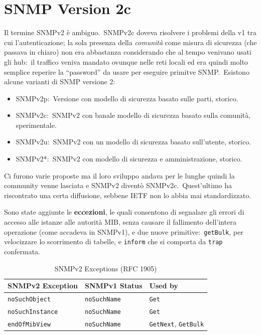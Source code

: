 \section{SNMP Version 2c}

Il termine SNMPv2 è ambiguo.\
SNMPv2c doveva risolvere i problemi della v1 tra cui l'autenticazione; la sola presenza della \textit{comunità} come misura di sicurezza (che passava in chiaro) non era abbastanza considerando che al tempo venivano usati gli hub:\ il traffico veniva mandato ovunque nelle reti locali ed era quindi molto semplice reperire la ``password'' da usare per eseguire primitve SNMP.\
Esistono alcune varianti di SNMP versione 2:
\begin{itemize}
    \item SNMPv2p:\ Versione con modello di sicurezza basato sulle parti, storico.
    \item SNMPv2c:\ SNMPv2 con banale modello di sicurezza basato sulla comunità, sperimentale.
    \item SNMPv2u:\ SNMPv2 con un modello di sicurezza basato sull'utente, storico.
    \item SNMPv2*:\ SNMPv2 con modello di sicurezza e amministrazione, storico.
\end{itemize}
Ci furono varie proposte ma il loro sviluppo andava per le lunghe quindi la community venne lasciata e SNMPv2 diventò SNMPv2c.\
Quest'ultimo ha riscontrato una certa diffusione, sebbene IETF non lo abbia mai standardizzato.\

Sono state aggiunte le \textbf{eccezioni}, le quali consentono di segnalare gli errori di accesso alle istanze alle autorità MIB, senza causare il fallimento dell'intera operazione (come accadeva in SNMPv1), e due nuove primitive:\ \texttt{getBulk}, per velocizzare lo scorrimento di tabelle, e \texttt{inform} che si comporta da \texttt{trap} confermata.\

\begin{table}[H]
    \centering
    \begin{tabular}{|l|l|l|}
        \hline
        SNMPv2 Exception        & SNMPv1 Status       & Used by                            \\\hline\hline
        \texttt{noSuchObject}   & \texttt{noSuchName} & \texttt{Get}                       \\
        \texttt{noSuchInstance} & \texttt{noSuchName} & \texttt{Get}                       \\
        \texttt{endOfMibView}   & \texttt{noSuchName} & \texttt{GetNext}, \texttt{GetBulk} \\\hline
    \end{tabular}
    \caption*{SNMPv2 Exceptions (RFC 1905)}
\end{table}

